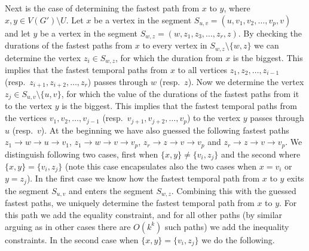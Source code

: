 \documentclass[11pt,a4paper]{article}
\theoremstyle{remark}
\theoremstyle{definition}
\begin{document}
Next is the case of determining the fastest path from $x$ to $y$, where $x,y \in V(G') \setminus U$.
Let $x$ be a vertex in the segment $S_{u,v} = (u,v_1,v_2, \dots, v_p, v)$ and let $y$ be a vertex in the segment $S_{w,z} = (w,z_1,z_3, \dots, z_r, z)$.
By checking the durations of the fastest paths from $x$ to every vertex in $S_{w,z} \setminus \{w,z\}$
we can determine the vertex $z_i \in S_{w,z} $, for which the duration from $x$ is the biggest.
This implies that the fastest temporal paths from $x$ to all vertices $z_1, z_2, \dots, z_{i-1}$ (resp.~$z_{i+1}, z_{i+2}, \dots, z_r$)  passes through $w$ (resp.~$z$).
Now we determine the vertex $z_j \in S_{u,v} \setminus \{u,v\}$,
for which the value of the durations of the fastest paths from it to the vertex $y$ is the biggest.
This implies that the fastest temporal paths from the vertices $v_1, v_2, \dots, v_{j-1}$ (resp.~$v_{j+1}, v_{j+2}, \dots, v_p$) to the vertex $y$ passes through $u$ (resp.~$v$).
At the beginning we have also guessed the following fastest paths  
$z_1 \rightarrow w \rightarrow u \rightarrow v_1$,
$z_1 \rightarrow w \rightarrow v \rightarrow v_p$,
$z_r \rightarrow z \rightarrow v \rightarrow v_p$ and
$z_r \rightarrow z \rightarrow v \rightarrow v_p$.
We distinguish following two cases,
first when $\{x,y\} \neq \{v_i, z_j\}$ and the second where $\{x,y\} = \{v_i, z_j\}$ (note this case encapsulates also the two cases when $x = v_i$ or $y=z_j$).
In the first case we know how the fastest temporal path from $x$ to $y$ exits the segment $S_{u,v}$ and enters the segment $S_{w,z}$.
Combining this with the guessed fastest paths, we uniquely determine the fastest temporal path from $x$ to $y$. 
For this path we add the equality constraint, and for all other paths (by similar arguing as in other cases there are $O(k^k)$ such paths) we add the inequality constraints.
In the second case when $\{x,y\} = \{v_i, z_j\}$ we do the following.
\end{document}
